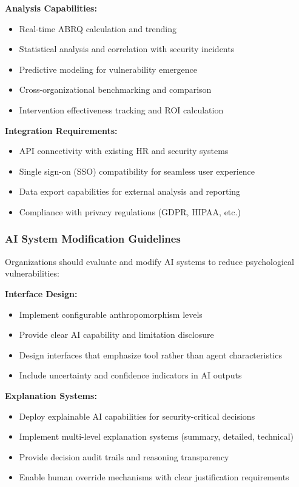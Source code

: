 \documentclass[11pt,a4paper]{article}
\begin{document}
\textbf{Analysis Capabilities:}
\begin{itemize}
\item Real-time ABRQ calculation and trending
\item Statistical analysis and correlation with security incidents
\item Predictive modeling for vulnerability emergence
\item Cross-organizational benchmarking and comparison
\item Intervention effectiveness tracking and ROI calculation
\end{itemize}

\textbf{Integration Requirements:}
\begin{itemize}
\item API connectivity with existing HR and security systems
\item Single sign-on (SSO) compatibility for seamless user experience
\item Data export capabilities for external analysis and reporting
\item Compliance with privacy regulations (GDPR, HIPAA, etc.)
\end{itemize}

\subsubsection{AI System Modification Guidelines}

Organizations should evaluate and modify AI systems to reduce psychological vulnerabilities:

\textbf{Interface Design:}
\begin{itemize}
\item Implement configurable anthropomorphism levels
\item Provide clear AI capability and limitation disclosure
\item Design interfaces that emphasize tool rather than agent characteristics
\item Include uncertainty and confidence indicators in AI outputs
\end{itemize}

\textbf{Explanation Systems:}
\begin{itemize}
\item Deploy explainable AI capabilities for security-critical decisions
\item Implement multi-level explanation systems (summary, detailed, technical)
\item Provide decision audit trails and reasoning transparency
\item Enable human override mechanisms with clear justification requirements
\end{itemize}
\end{document}
